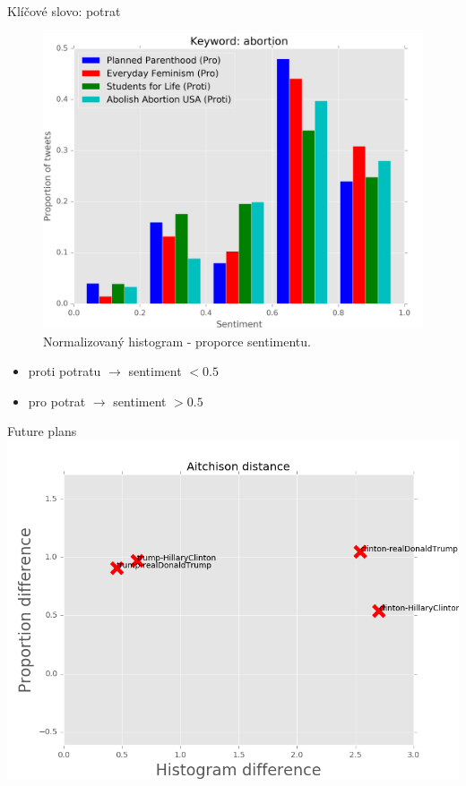 \documentclass[notheorems,12pt]{beamer}
\begin{document}
\begin{frame}{Klíčové slovo: potrat}
    \begin{figure}
        \centering
        \includegraphics[scale=0.37]{./Pics/abortion-normed.png}
        \vspace{-0.2cm}
        \caption*{Normalizovaný histogram - proporce sentimentu.}
    \end{figure}
    \vspace{-0.4cm}
	\begin{itemize}
		\item proti potratu $\rightarrow$ sentiment $< 0.5$
        \item pro potrat $\rightarrow$ sentiment $> 0.5$
	\end{itemize}
\end{frame}
\begin{frame}{Future plans}
    \center
    \includegraphics[scale=0.52]{./Pics/measure.png}
\end{frame}
\end{document}
